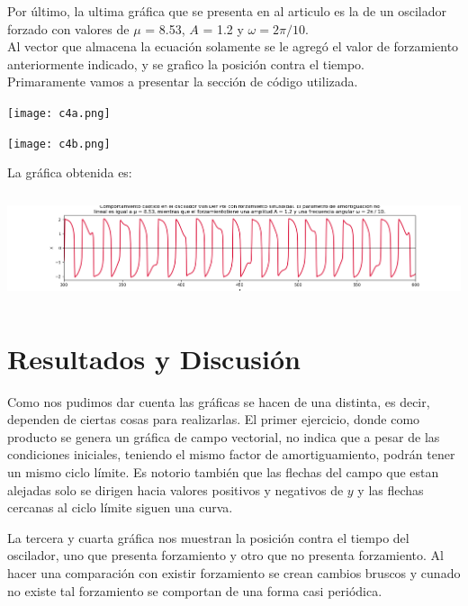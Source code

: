 \documentclass[12pt]{article}
\begin{document}
Por último, la ultima gráfica que se presenta en al articulo es la de un oscilador forzado con valores de $\mu$ = 8.53, $A$ = 1.2 y $\omega = 2\pi/ 10$. \\

Al vector que almacena la ecuación solamente se le agregó el valor de forzamiento anteriormente indicado, y se grafico la posición contra el tiempo.\\

Primaramente vamos a presentar la sección de código utilizada.
\begin{center}
    \texttt{[image: c4a.png]}\\
\end{center}
\begin{center}
    \texttt{[image: c4b.png]}\\
\end{center}
\newpage
La gráfica obtenida es:
\begin{center}
    \includegraphics[height=3.15cm]{Producto4.png}\\
\end{center}

\section*{Resultados y Discusión}
Como nos pudimos dar cuenta las gráficas se hacen de una distinta, es decir, dependen de ciertas cosas para realizarlas.
El primer ejercicio, donde como producto se genera un gráfica de campo vectorial, no indica que a pesar de las condiciones iniciales, teniendo el mismo factor de amortiguamiento, podrán tener un mismo ciclo límite. Es notorio también que las flechas del campo que estan alejadas solo se dirigen hacia valores positivos y negativos de $y$ y las flechas cercanas al ciclo límite siguen una curva.

La tercera y cuarta gráfica nos muestran la posición contra el tiempo del oscilador, uno que presenta forzamiento y otro que no presenta forzamiento. Al hacer una comparación con existir forzamiento se crean cambios bruscos y cunado no existe tal forzamiento se comportan de una forma casi periódica.
\end{document}
